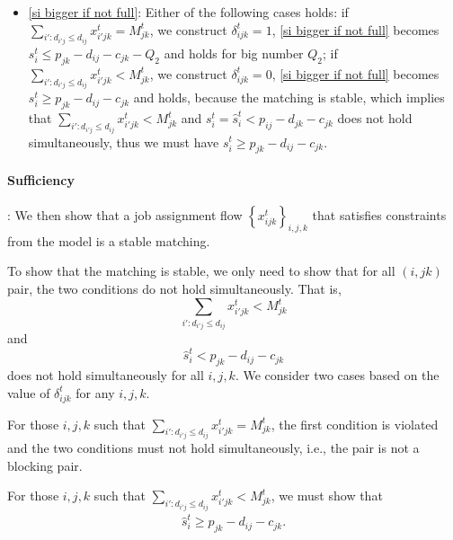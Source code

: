 \documentclass[trsc,nonblindrev]{informs3noheader}
\begin{document}
\begin{itemize}
    if $\sum_{jk\in\mathcal{M}^t} x_{ijk}^t=W_i^t$ and we construct $\zeta_{i}^t=1$, thus \eqref{stability end} becomes $s_i^t\leq Q_2$ and holds for big number $Q_2$;
    if $\sum_{jk\in\mathcal{M}^t} x_{ijk}^t<W_i^t$, we construct $\zeta_{i}^t=0$ and $s_i^t=\min \left\{\min_{jk\in \mu(i)} \left(p_{jk}-d_{ij}-c_{jk}\right),0\right\}$, \eqref{stability end} becomes $s_i^t\leq 0$ and holds by our construction of $s_i^t$;
    \item \eqref{si bigger if not full}: Either of the following cases holds: 
    if $\sum_{i':d_{i'j}\le d_{ij}} x^t_{i'jk} = M_{jk}^t$, we construct $\delta_{ijk}^t=1$, \eqref{si bigger if not full} becomes $s_i^t \leq p_{jk} - d_{ij} - c_{jk} - Q_2$ and holds for big number $Q_2$; 
    if $\sum_{i':d_{i'j}\le d_{ij}} x^t_{i'jk} < M_{jk}^t$, we construct $\delta_{ijk}^t=0$, \eqref{si bigger if not full} becomes $s_i^t \geq p_{jk} - d_{ij} - c_{jk}$ and holds, because the matching is stable, which implies that $\sum_{i':d_{i'j}\le d_{ij}} x^t_{i'jk} < M_{jk}^t$ and $s_i^t=\hat{s}_i^t<p_{ij}-d_{jk}-c_{jk}$ does not hold simultaneously, thus we must have $s_i^t \geq p_{jk} - d_{ij} - c_{jk}$.
\end{itemize}


\paragraph{Sufficiency}: We then show that a job assignment flow $\left\{x_{ijk}^t\right\}_{i,j,k}$ that satisfies constraints from the model is a stable matching.

To show that the matching is stable, we only need to show that for all $(i,jk)$ pair, the two conditions do not hold simultaneously. That is,
\[
\sum_{i': d_{i'j} \le d_{ij}} x_{i'jk}^t < M_{jk}^t
\]
and 
\[
\hat{s}_i^t < p_{jk} - d_{ij} - c_{jk}
\]
does not hold simultaneously for all $i,j,k$. We consider two cases based on the value of $\delta^t_{ijk}$ for any $i,j,k$.

For those $i,j,k$ such that $\sum_{i': d_{i'j} \le d_{ij}} x_{i'jk}^t = M_{jk}^t$, the first condition is violated and the two conditions must not hold simultaneously, i.e., the pair is not a blocking pair.

For those $i,j,k$ such that $\sum_{i': d_{i'j} \le d_{ij}} x_{i'jk}^t < M_{jk}^t$, we must show that 
\begin{align}\label{eq:sihatt}
\hat{s}_i^t \geq p_{jk} - d_{ij} - c_{jk}.
\end{align}
\end{document}
